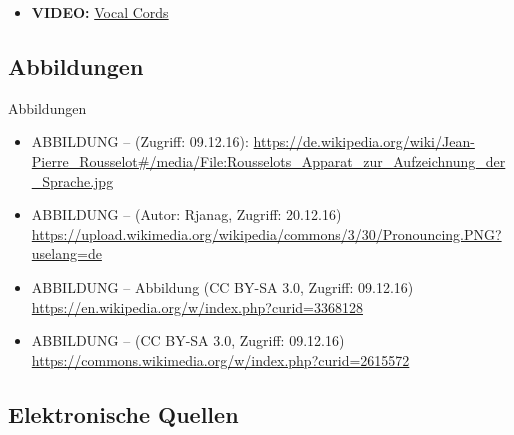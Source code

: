 \begin{frame}{\textipa{[ S l U s ]}}

	\begin{itemize}
		\item \textbf{VIDEO:} \href{run:material/04vocalcordssinging.wmv}{Vocal Cords}
	\end{itemize}
	
\end{frame}


\subsection{Abbildungen}
\begin{frame}[allowframebreaks]{Abbildungen}
	\small
		
		\begin{itemize}
			\item ABBILDUNG --  (Zugriff: 09.12.16): \url{https://de.wikipedia.org/wiki/Jean-Pierre\_Rousselot\#/media/File:Rousselots\_Apparat\_zur\_Aufzeichnung\_der\_Sprache.jpg}
			\item ABBILDUNG --  (Autor: Rjanag, Zugriff: 20.12.16) \url{https://upload.wikimedia.org/wikipedia/commons/3/30/Pronouncing.PNG?uselang=de}
			\item ABBILDUNG -- Abbildung  (CC BY-SA 3.0, Zugriff: 09.12.16) \url{https://en.wikipedia.org/w/index.php?curid=3368128}
			\item ABBILDUNG --  (CC BY-SA 3.0, Zugriff: 09.12.16) \url{https://commons.wikimedia.org/w/index.php?curid=2615572}
		\end{itemize}	
	
\end{frame}

\subsection{Elektronische Quellen}

